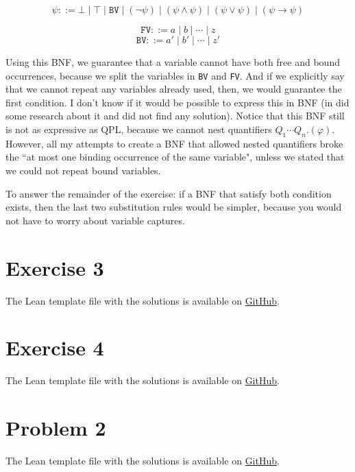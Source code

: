 \documentclass[11pt]{article}
\begin{document}
$$\psi ::= \bot \mid \top \mid \texttt{BV} \mid (\lnot \psi) \mid (\psi \land \psi) \mid (\psi \lor \psi) \mid (\psi \to \psi)$$

$$\texttt{FV} ::= a \mid b \mid \cdots \mid z$$
$$\texttt{BV} ::= a' \mid b' \mid \cdots \mid z'$$

Using this BNF, we guarantee that a variable cannot have both free and bound occurrences, because we split the variables in \texttt{BV} and \texttt{FV}. And if we explicitly say that we cannot repeat any variables already used, then, we would guarantee the first condition. I don't know if it would be possible to express this in BNF (in did some research about it and did not find any solution). Notice that this BNF still is not as expressive as QPL, because we cannot nest quantifiers $Q_1 \cdots Q_n.(\varphi)$. However, all my attempts to create a BNF that allowed nested quantifiers broke the ``at most one binding occurrence of the same variable", unless we stated that we could not repeat bound variables. 

To answer the remainder of the exercise: if a BNF that satisfy both condition exists, then the last two substitution rules would be simpler, because you would not have to worry about variable captures.



\section*{Exercise 3}
The Lean template file with the solutions is available on \href{https://github.com/lucastassis/BU-CS511/blob/main/HW04/code/HW04.lean}{GitHub}.

\section*{Exercise 4}
The Lean template file with the solutions is available on \href{https://github.com/lucastassis/BU-CS511/blob/main/HW04/code/HW04.lean}{GitHub}.

\section*{Problem 2}
The Lean template file with the solutions is available on \href{https://github.com/lucastassis/BU-CS511/blob/main/HW04/code/HW04.lean}{GitHub}.
\end{document}
